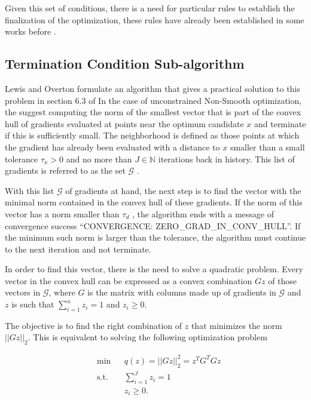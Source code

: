 Given this set of conditions, there is a need for particular rules to establish the finalization of the optimization, these rules have already been established in some works before \citep{overtonlewis, skajaa}.

\subsection{Termination Condition Sub-algorithm}
Lewis and Overton formulate an algorithm that gives a practical solution to this problem in section $6.3$ of \citep{overtonlewis}
In the case of unconstrained Non-Smooth optimization, the suggest computing the norm of the smallest vector that is part of the convex hull of gradients evaluated at points near the optimum candidate $x$ and terminate if this is sufficiently small. The neighborhood is defined as those points at which the gradient has already been evaluated with a distance to $x$ smaller than a small tolerance $\tau_x > 0$ and no more than $J \in \mathbb{N}$ iterations back in history. This list of gradients is referred to as the set $\mathcal{G}$ \citep{overtonlewis}.

With this list $\mathcal{G}$ of gradients at hand, the next step is to find the vector with the minimal norm contained in the convex hull of these gradients.  If the norm of this vector has a norm smaller than $\tau_d$ , the algorithm ends with a message of convergence success ``CONVERGENCE: ZERO\_GRAD\_IN\_CONV\_HULL''. If the minimum such norm is larger than the tolerance, the algorithm must continue to the next iteration and not terminate.

In order to find this vector, there is the need to solve a quadratic problem. Every vector in the convex hull can be expressed as a convex combination $Gz$ of those vectors in $\mathcal{G}$, where $G$ is the matrix with columns made up of gradients in $\mathcal{G}$ and $z$ is such that $\sum_{i=1}^n z_i = 1$ and $z_i \geq 0$.

The objective is to find the right combination of $z$ that minimizes the norm $||Gz||_2$.  This is equivalent to solving the following optimization problem

\begin{equation} \label{quadraticproblem}
  \begin{aligned}
    & {\text{min}}
    & & q(z) = ||G z ||_2^2 = z^TG^TGz  \\
    & \text{s.t.}
    & & \sum_{i = 1} ^J z_i = 1 \; \\
    & & & z_i \geq 0.
  \end{aligned}
\end{equation}

